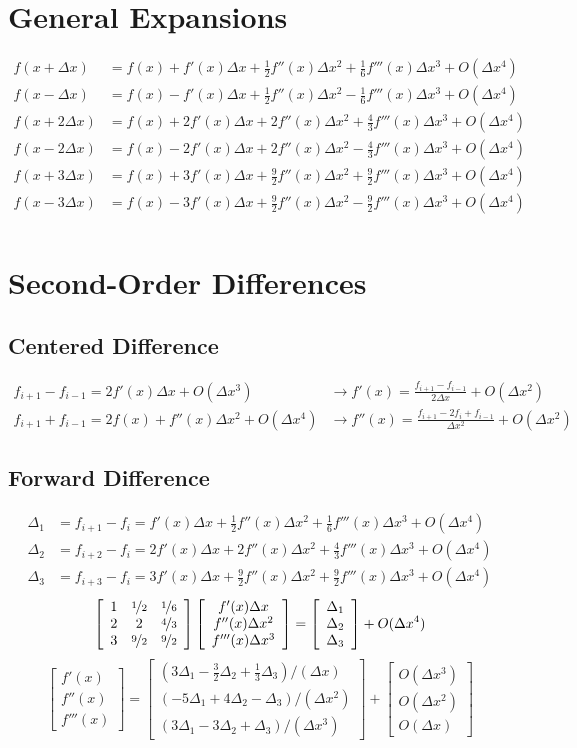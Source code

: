 \documentclass[12pt]{article}
\newcommand{\tByt}[9]{
	\left[\begin{array}{c c c}
		#1 & #2 & #3 \\
		#4 & #5 & #6 \\
		#7 & #8 & #9 \\
		\end{array}\right]
}
\newcommand{\tvec}[3]
{	
	\left[
	\begin{array}{c}
		#1 \\ #2 \\ #3
	\end{array}
	\right]
}
\newcommand{\dx}{\Delta x}
\begin{document}
\section{General Expansions}
\begin{align*}
f(x+\dx) &= f(x)+f'(x)\dx + \frac{1}{2}f''(x)\dx^2+\frac{1}{6}f'''(x)\dx^3+O(\dx^4)\\
f(x-\dx) &= f(x)-f'(x)\dx + \frac{1}{2}f''(x)\dx^2-\frac{1}{6}f'''(x)\dx^3+O(\dx^4)\\
f(x+2\dx) &= f(x)+2f'(x)\dx + 2f''(x)\dx^2+\frac{4}{3}f'''(x)\dx^3+O(\dx^4) \\
f(x-2\dx) &= f(x)-2f'(x)\dx + 2f''(x)\dx^2-\frac{4}{3}f'''(x)\dx^3+O(\dx^4) \\
f(x+3\dx) &= f(x)+3f'(x)\dx + \frac{9}{2}f''(x)\dx^2+\frac{9}{2}f'''(x)\dx^3+O(\dx^4) \\
f(x-3\dx) &= f(x)-3f'(x)\dx + \frac{9}{2}f''(x)\dx^2-\frac{9}{2}f'''(x)\dx^3+O(\dx^4) \\
\end{align*}
\section{Second-Order Differences}
\subsection{Centered Difference}
\begin{align*}
f_{i+1}-f_{i-1} = 2f'(x)\dx+O(\dx^3) &\rightarrow f'(x) = \frac{f_{i+1}-f_{i-1}}{2\dx} + O(\dx^2) \\
f_{i+1}+f_{i-1} = 2f(x)+f''(x)\dx^2+O(\dx^4) &\rightarrow f''(x) = \frac{f_{i+1}-2f_i+f_{i-1}}{\dx^2} + O(\dx^2) 
\end{align*}
\subsection{Forward Difference}
\newcommand{\del}{\Delta}
\begin{align*}
\del_1 &= f_{i+1}-f_{i} = f'(x)\dx + \frac{1}{2}f''(x)\dx^2+\frac{1}{6}f'''(x)\dx^3+O(\dx^4)\\
\del_2 &= f_{i+2}-f_{i} = 2f'(x)\dx + 2f''(x)\dx^2+\frac{4}{3}f'''(x)\dx^3+O(\dx^4) \\
\del_3 &= f_{i+3}-f_{i} = 3f'(x)\dx + \frac{9}{2}f''(x)\dx^2+\frac{9}{2}f'''(x)\dx^3+O(\dx^4)
\end{align*}
\begin{equation*}
\tByt{1}{\nicefrac{1}{2}}{\nicefrac{1}{6}}{2}{2}{\nicefrac{4}{3}}{3}{\nicefrac{9}{2}}{\nicefrac{9}{2}}\tvec{f'(x)\dx}{f''(x)\dx^2}{f'''(x)\dx^3} = \tvec{\del_1}{\del_2}{\del_3} + O(\dx^4)
\end{equation*}
\begin{equation*}
\tvec{f'(x)}{f''(x)}{f'''(x)}= \tvec{(3\del_1-\frac{3}{2}\del_2+\frac{1}{3}\del_3)/(\dx)}{(-5\del_1+4\del_2-\del_3)/(\dx^2)}{(3\del_1-3\del_2+\del_3)/(\dx^3)}+\tvec{O(\dx^3)}{O(\dx^2)}{O(\dx)}
\end{equation*}
\end{document}
